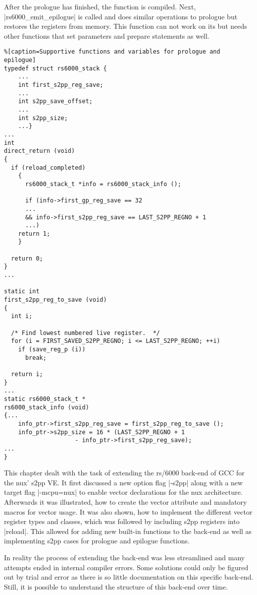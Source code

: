 After the prologue has finished, the function is compiled.
Next, |rs6000_emit_epilogue| is called and does similar operations to prologue but restores the registers from memory.
This function can not work on its but needs other functions that set parameters and prepare statements as well.
\begin{lstlisting}%[caption=Supportive functions and variables for prologue and epilogue]
typedef struct rs6000_stack {
    ...
    int first_s2pp_reg_save;
    ...
    int s2pp_save_offset;
    ...
    int s2pp_size;
    ...}
...
int
direct_return (void)
{
  if (reload_completed)
    {
      rs6000_stack_t *info = rs6000_stack_info ();

      if (info->first_gp_reg_save == 32
      ...
      && info->first_s2pp_reg_save == LAST_S2PP_REGNO + 1
      ...)
    return 1;
    }

  return 0;
}
...

static int
first_s2pp_reg_to_save (void)
{
  int i;

  /* Find lowest numbered live register.  */
  for (i = FIRST_SAVED_S2PP_REGNO; i <= LAST_S2PP_REGNO; ++i)
    if (save_reg_p (i))
      break;

  return i;
}
...
static rs6000_stack_t *
rs6000_stack_info (void)
{...
    info_ptr->first_s2pp_reg_save = first_s2pp_reg_to_save ();
    info_ptr->s2pp_size = 16 * (LAST_S2PP_REGNO + 1
                    - info_ptr->first_s2pp_reg_save);
...
}
\end{lstlisting}

This chapter dealt with the task of extending the \ac{rs/6000} back-end of \ac{GCC} for the nux' \ac{s2pp} \ac{VE}.
It first discussed a new option flag |-s2pp| along with a new target flag |-mcpu=nux| to enable vector declarations for the nux architecture.
Afterwards it was illustrated, how to create the vector attribute and mandatory macros for vector usage.
It was also shown, how to implement the different vector register types and classes, which was followed by including s2pp registers into |reload|.
This allowed for adding new built-in functions to the back-end as well as implementing s2pp cases for prologue and epilogue functions.

In reality the process of extending the back-end was less streamlined and many attempts ended in internal compiler errors.
Some solutions could only be figured out by trial and error as there is so little documentation on this specific back-end.
Still, it is possible to understand the structure of this back-end over time.



